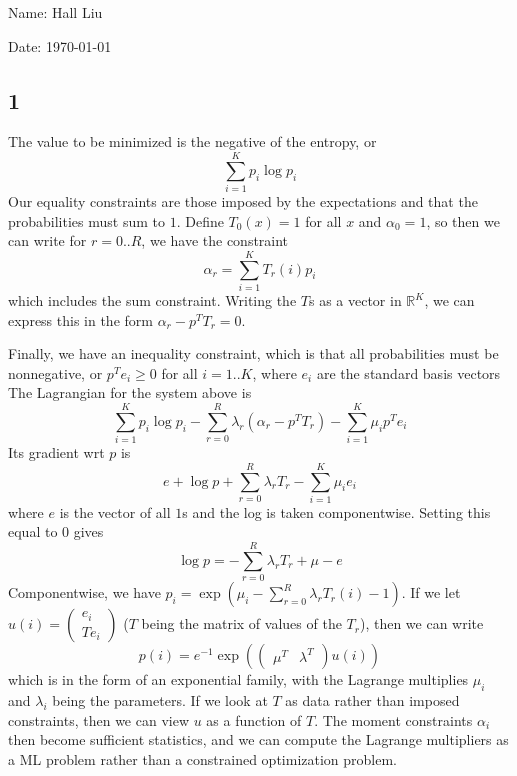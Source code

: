 \documentclass{article}
\newcommand{\openm}{\begin{pmatrix}}
\newcommand{\closem}{\end{pmatrix}}
\newcommand{\rn}{\mathbb{R}}
\begin{document}
Name: Hall Liu

Date: \today 
\vspace{1.5cm}
\subsection*{1}
The value to be minimized is the negative of the entropy, or
\[\sum_{i=1}^K p_i\log p_i\]
Our equality constraints are those imposed by the expectations and that the probabilities must sum to $1$. Define $T_0(x)=1$ for all $x$ and $\alpha_0=1$, so then we can write for $r=0..R$, we have the constraint 
\[\alpha_r=\sum_{i=1}^KT_r(i)p_i\]
which includes the sum constraint. Writing the $T$s as a vector in $\rn^K$, we can express this in the form $\alpha_r-p^TT_r=0$.

Finally, we have an inequality constraint, which is that all probabilities must be nonnegative, or $p^Te_i\geq0$ for all $i=1..K$, where $e_i$ are the standard basis vectors
The Lagrangian for the system above is 
\[\sum_{i=1}^K p_i\log p_i-\sum_{r=0}^R\lambda_r(\alpha_r-p^TT_r)-\sum_{i=1}^K\mu_ip^Te_i\]
Its gradient wrt $p$ is 
\[e+\log p+\sum_{r=0}^R\lambda_rT_r-\sum_{i=1}^K\mu_ie_i\]
where $e$ is the vector of all $1$s and the log is taken componentwise. Setting this equal to $0$ gives
\[\log p=-\sum_{r=0}^R\lambda_rT_r+\mu-e\]
Componentwise, we have $p_i=\exp\left(\mu_i-\sum_{r=0}^R\lambda_r T_r(i)-1\right)$. If we let $u(i)=\openm e_i\\Te_i\closem$ ($T$ being the matrix of values of the $T_r$), then we can write
\[p(i)=e^{-1}\exp\left(\openm \mu^T &\lambda^T\closem u(i)\right)\]
which is in the form of an exponential family, with the Lagrange multiplies $\mu_i$ and $\lambda_i$ being the parameters.
If we look at $T$ as data rather than imposed constraints, then we can view $u$ as a function of $T$. The moment constraints $\alpha_i$ then become sufficient statistics, and we can compute the Lagrange multipliers as a ML problem rather than a constrained optimization problem.
\end{document}
